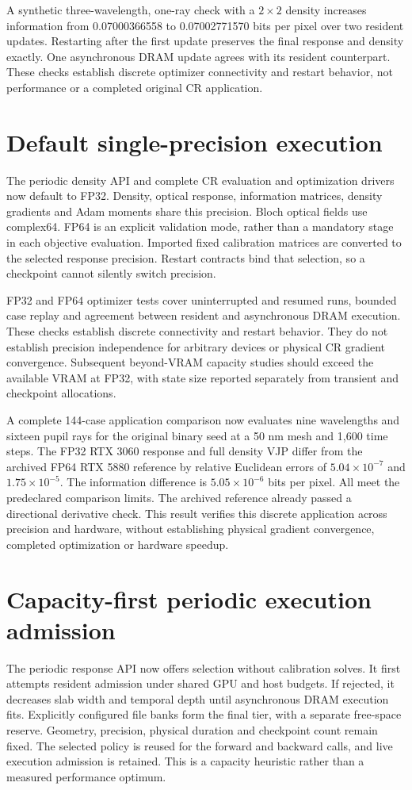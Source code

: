 \documentclass[11pt,a4paper]{article}
\begin{document}
A synthetic three-wavelength, one-ray check with a $2\times2$ density increases
information from 0.07000366558 to 0.07002771570 bits per pixel over two resident
updates. Restarting after the first update preserves the final response and
density exactly. One asynchronous DRAM update agrees with its resident
counterpart. These checks establish discrete optimizer connectivity and
restart behavior, not performance or a completed original CR application.

\section{Default single-precision execution}
The periodic density API and complete CR evaluation and optimization drivers
now default to FP32. Density, optical response, information matrices, density
gradients and Adam moments share this precision. Bloch optical fields use
complex64. FP64 is an explicit validation mode, rather than a mandatory
stage in each objective evaluation. Imported fixed calibration matrices are
converted to the selected response precision. Restart contracts bind that
selection, so a checkpoint cannot silently switch precision.

FP32 and FP64 optimizer tests cover uninterrupted and resumed runs, bounded
case replay and agreement between resident and asynchronous DRAM execution.
These checks establish discrete connectivity and restart behavior. They do
not establish precision independence for arbitrary devices or physical CR
gradient convergence. Subsequent beyond-VRAM capacity studies should exceed
the available VRAM at FP32, with state size reported separately from transient
and checkpoint allocations.

A complete 144-case application comparison now evaluates nine wavelengths
and sixteen pupil rays for the original binary seed at a 50 nm mesh and
1,600 time steps. The FP32 RTX 3060 response and full density VJP differ from
the archived FP64 RTX 5880 reference by relative Euclidean errors of
$5.04\times10^{-7}$ and $1.75\times10^{-5}$. The information difference is
$5.05\times10^{-6}$ bits per pixel. All meet the predeclared comparison
limits. The archived reference already passed a directional derivative
check. This result verifies this discrete application across precision and
hardware, without establishing physical gradient convergence, completed
optimization or hardware speedup.

\section{Capacity-first periodic execution admission}
The periodic response API now offers selection without calibration solves.
It first attempts resident admission under shared GPU and host budgets.
If rejected, it decreases slab width and temporal depth until asynchronous
DRAM execution fits. Explicitly configured file banks form the final tier,
with a separate free-space reserve. Geometry, precision, physical duration
and checkpoint count remain fixed. The selected policy is reused for the
forward and backward calls, and live execution admission is retained.
This is a capacity heuristic rather than a measured performance optimum.
\end{document}

